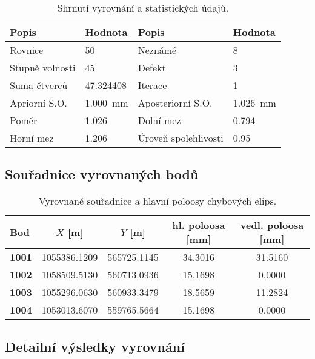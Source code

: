\begin{table}[H]
    \centering
    \caption{Shrnutí vyrovnání a statistických údajů.}
    \begin{tabularx}{\textwidth}{@{} l X l X @{}}
    \toprule
    \textbf{Popis} & \textbf{Hodnota} & \textbf{Popis} & \textbf{Hodnota} \\
    \midrule
    Rovnice & 50 & Neznámé & 8 \\
    Stupně volnosti & 45 & Defekt & 3 \\
    Suma čtverců & \num{47.324408} & Iterace & 1 \\
    Apriorní S.O. & \SI{1.000}{mm} & Aposteriorní S.O. & \SI{1.026}{mm} \\
    Poměr & \num{1.026} & Dolní mez & \num{0.794} \\
    Horní mez & \num{1.206} & Úroveň spolehlivosti & \num{0.95} \\
    \bottomrule
    \end{tabularx}
    \label{tab:adjustment_summary_vse}
\end{table}

\subsection{Souřadnice vyrovnaných bodů}
\begin{table}[H]
    \centering
    \caption{Vyrovnané souřadnice a hlavní poloosy chybových elips.}
    \begin{tabularx}{\textwidth}{@{} l S[table-format=10.4] S[table-format=10.4] S[table-format=2.4] S[table-format=2.4] @{}}
    \toprule
    \textbf{Bod} & {$X$ [\si{\m}]} & {$Y$ [\si{\m}]} & \textbf{hl. poloosa [\si{\mm}]} & \textbf{vedl. poloosa [\si{\mm}]} \\
    \midrule
    \textbf{1001} & \num{1055386.1209} & \num{565725.1145} & \num{34.3016} & \num{31.5160} \\
    \textbf{1002} & \num{1058509.5130} & \num{560713.0936} & \num{15.1698} & \num{0.0000} \\
    \textbf{1003} & \num{1055296.0630} & \num{560933.3479} & \num{18.5659} & \num{11.2824} \\
    \textbf{1004} & \num{1053013.6070} & \num{559765.5664} & \num{15.1698} & \num{0.0000} \\
    \bottomrule
    \end{tabularx}
    \label{tab:adjusted_coords_vse}
\end{table}

\subsection{Detailní výsledky vyrovnání}

